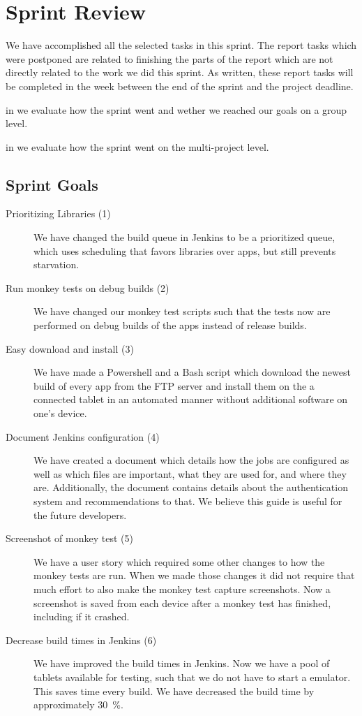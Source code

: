 \chapter{Sprint Review}\label{chap:sprint4_end}
We have accomplished all the selected tasks in this sprint. The report tasks which were postponed are related to finishing the parts of the report which are not directly related to the work we did this sprint. As written, these report tasks will be completed in the week between the end of the sprint and the project deadline.

\begin{chapterorganization}
    \item in  we evaluate how the sprint went and wether we reached our goals on a group level.
    \item in  we evaluate how the sprint went on the multi-project level.
\end{chapterorganization}

\section{Sprint Goals}\label{sec:s4_goals}
\begin{description}
    \item[Prioritizing Libraries (1)] We have changed the build queue in Jenkins to be a prioritized queue, which uses scheduling that favors libraries over apps, but still prevents starvation.
    \item[Run monkey tests on debug builds (2)] We have changed our monkey test scripts such that the tests now are performed on debug builds of the apps instead of release builds.
    \item[Easy download and install (3)] We have made a Powershell and a Bash script which download the newest build of every app from the FTP server and install them on the a connected tablet in an automated manner without additional software on one's device.
    \item[Document Jenkins configuration (4)] We have created a document which details how the jobs are configured as well as which files are important, what they are used for, and where they are. Additionally, the document contains details about the authentication system and recommendations to that. We believe this guide is useful for the future developers.
    \item[Screenshot of monkey test (5)] We have a user story which required some other changes to how the monkey tests are run. When we made those changes it did not require that much effort to also make the monkey test capture screenshots. Now a screenshot is saved from each device after a monkey test has finished, including if it crashed.
    \item[Decrease build times in Jenkins (6)] We have improved the build times in Jenkins. Now we have a pool of tablets available for testing, such that we do not have to start a emulator. This saves time every build. We have decreased the build time by approximately \SI{30}{\percent}.
\end{description}
